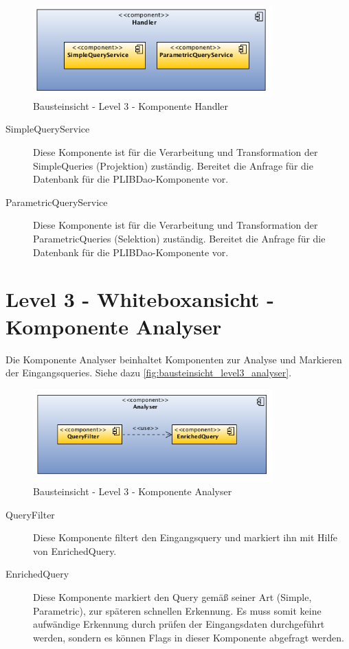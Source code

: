 \begin{figure}[htbp]
	\centering
		\includegraphics[width=0.82\textwidth]{images/bausteinsicht_plib_level3_handler.png}
	\caption{Bausteinsicht - Level 3 - Komponente Handler}
	\label{fig:bausteinsicht_level3_handler}
\end{figure}

\begin{description}
\item[SimpleQueryService] Diese Komponente ist für die Verarbeitung und Transformation der SimpleQueries (Projektion) zuständig. Bereitet die Anfrage für die Datenbank für die PLIBDao-Komponente vor. 
\item[ParametricQueryService] Diese Komponente ist für die Verarbeitung und Transformation der ParametricQueries (Selektion) zuständig. Bereitet die Anfrage für die Datenbank für die PLIBDao-Komponente vor. 
\end{description}

\section{Level 3 - Whiteboxansicht - Komponente Analyser}

Die Komponente Analyser beinhaltet Komponenten zur Analyse und Markieren der Eingangsqueries. Siehe dazu \autoref{fig:bausteinsicht_level3_analyser}. 

\begin{figure}[htbp]
	\centering
		\includegraphics[width=0.82\textwidth]{images/bausteinsicht_plib_level3_analyser.png}
	\caption{Bausteinsicht - Level 3 - Komponente Analyser}
	\label{fig:bausteinsicht_level3_analyser}
\end{figure}

\begin{description}
\item[QueryFilter] Diese Komponente filtert den Eingangsquery und markiert ihn mit Hilfe von EnrichedQuery.
\item[EnrichedQuery] Diese Komponente markiert den Query gemäß seiner Art (Simple, Parametric), zur späteren schnellen Erkennung. Es muss somit keine aufwändige Erkennung durch prüfen der Eingangsdaten durchgeführt werden, sondern es können Flags in dieser Komponente abgefragt werden. 
\end{description}
